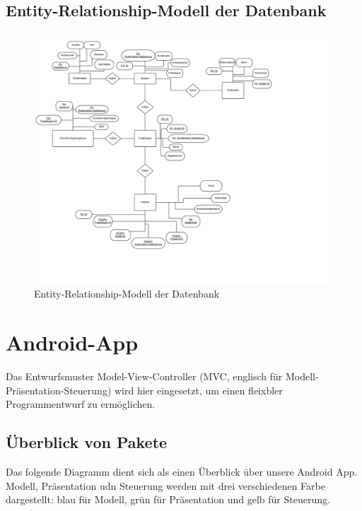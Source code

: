 \documentclass[a4paper]{scrreprt}
\begin{document}
        \newpage
        \section{Entity-Relationship-Modell der Datenbank}
            \begin{figure}[ht]
                \centering
                \includegraphics[scale = 0.13]{PSE_Datenbank_ERM.jpeg}
                \caption{Entity-Relationship-Modell der Datenbank}
            \end{figure}


    \newpage
    \chapter{Android-App}

        Das Entwurfsmuster Model-View-Controller (MVC, englisch für Modell-Präsentation-Steuerung) wird hier eingesetzt, um einen fleixbler Programmentwurf zu ermöglichen.


        \vspace*{1cm}
        \section{Überblick von Pakete}

            Das folgende Diagramm dient sich als einen Überblick über unsere Android App. Modell, Präsentation udn Steuerung werden mit drei verschiedenen Farbe dargestellt: blau für Modell, grün für Präsentation und gelb für Steuerung.
\end{document}
